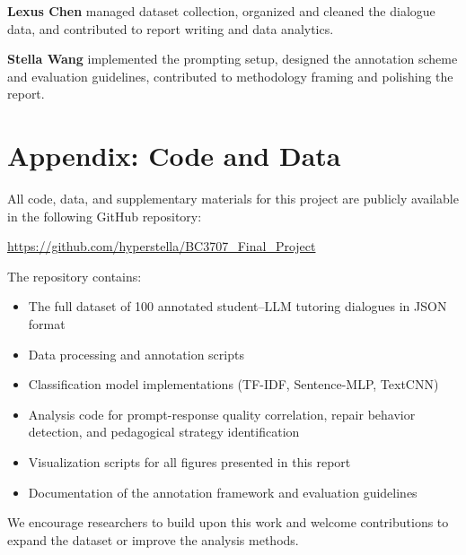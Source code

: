 \textbf{Lexus Chen} managed dataset collection, organized and cleaned the dialogue data, and contributed to report writing and data analytics.

\textbf{Stella Wang} implemented the prompting setup, designed the annotation scheme and evaluation guidelines, contributed to methodology framing and polishing the report.





\appendix

\section*{Appendix: Code and Data}

All code, data, and supplementary materials for this project are publicly available in the following GitHub repository:

\begin{center}
\url{https://github.com/hyperstella/BC3707_Final_Project}
\end{center}

The repository contains:

\begin{itemize}
    \item The full dataset of 100 annotated student--LLM tutoring dialogues in JSON format
    \item Data processing and annotation scripts
    \item Classification model implementations (TF-IDF, Sentence-MLP, TextCNN)
    \item Analysis code for prompt-response quality correlation, repair behavior detection, and pedagogical strategy identification
    \item Visualization scripts for all figures presented in this report
    \item Documentation of the annotation framework and evaluation guidelines
\end{itemize}

We encourage researchers to build upon this work and welcome contributions to expand the dataset or improve the analysis methods.



